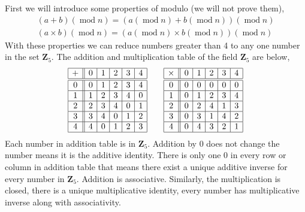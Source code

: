 \documentclass[addpoints]{exam}
\theoremstyle{mytheoremstyle}
\theoremstyle{mytheoremstyle}
\theoremstyle{myproblemstyle}
\begin{document}
\begin{questions}
\begin{parts}
        \begin{solution}
            First we will introduce some properties of modulo (we will not prove them),
            \begin{align*}
                (a+b)(\operatorname{mod}{n})=(a(\operatorname{mod}{n})+b(\operatorname{mod}{n}))(\operatorname{mod}{n}) \\
                (a\times b)(\operatorname{mod}{n})=(a(\operatorname{mod}{n})\times b(\operatorname{mod}{n}))(\operatorname{mod}{n})
            \end{align*}
            With these properties we can reduce numbers greater than 4 to any one number in the set \(\mathbf{Z}_{5}\). The addition and multiplication table of the field \(\mathbf{Z}_5\) are below,
            \begin{align*}
                \begin{array}{|c||c|c|c|c|c|}
                    \hline
                    + & 0 & 1 & 2 & 3 & 4 \\\hline\hline
                    0 & 0 & 1 & 2 & 3 & 4 \\\hline
                    1 & 1 & 2 & 3 & 4 & 0 \\\hline
                    2 & 2 & 3 & 4 & 0 & 1 \\\hline
                    3 & 3 & 4 & 0 & 1 & 2 \\\hline
                    4 & 4 & 0 & 1 & 2 & 3 \\\hline
                \end{array} \qquad
                \begin{array}{|c||c|c|c|c|c|}
                    \hline
                    \times & 0 & 1 & 2 & 3 & 4 \\\hline\hline
                    0      & 0 & 0 & 0 & 0 & 0 \\\hline
                    1      & 0 & 1 & 2 & 3 & 4 \\\hline
                    2      & 0 & 2 & 4 & 1 & 3 \\\hline
                    3      & 0 & 3 & 1 & 4 & 2 \\\hline
                    4      & 0 & 4 & 3 & 2 & 1 \\\hline
                \end{array}
            \end{align*}
            Each number in addition table is in \(\mathbf{Z}_{5}\). Addition by 0 does not change the number means it is the additive identity. There is only one 0 in every row or column in addition table that means there exist a unique additive inverse for every number in \(\mathbf{Z}_{5}\). Addition is associative. Similarly, the multiplication is closed, there is a unique multiplicative identity, every number has multiplicative inverse along with associativity.

\end{solution}
\end{parts}
\end{questions}
\end{document}

